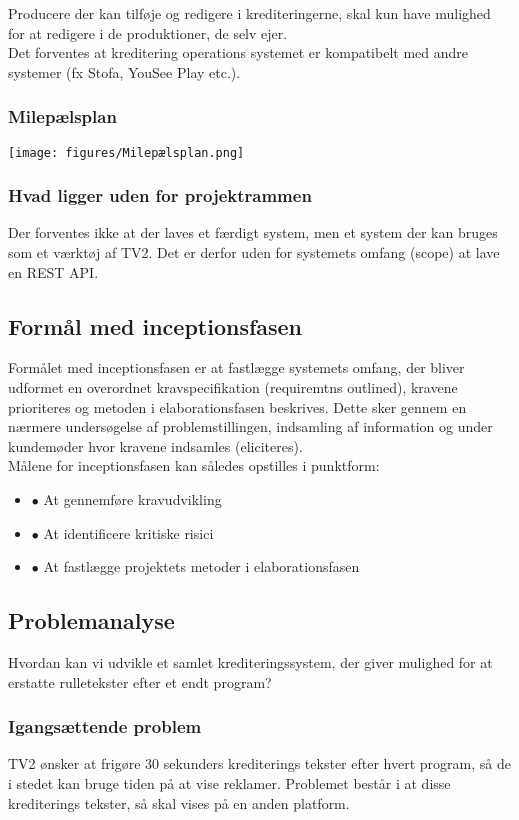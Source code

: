 \noindent
Producere der kan tilføje og redigere i krediteringerne, skal kun have mulighed for at redigere i de produktioner, de selv ejer.\\
Det forventes at kreditering operations systemet er kompatibelt med andre systemer (fx Stofa, YouSee Play etc.).

\subsubsection{Milepælsplan}
\texttt{[image: figures/Milepælsplan.png]}

\subsubsection{Hvad ligger uden for projektrammen}
Der forventes ikke at der laves et færdigt system, men et system der kan bruges som et værktøj af TV2. Det er derfor uden for systemets omfang (scope) at lave en REST API.

\subsection{Formål med inceptionsfasen}
Formålet med inceptionsfasen er at fastlægge systemets omfang, der bliver udformet en overordnet kravspecifikation (requiremtns outlined), kravene prioriteres og metoden i elaborationsfasen beskrives. Dette sker gennem en nærmere undersøgelse af problemstillingen, indsamling af information og under kundemøder hvor kravene indsamles (eliciteres).\\

\noindent
Målene for inceptionsfasen kan således opstilles i punktform:
\begin{itemize}
    \item $\bullet$ At gennemføre kravudvikling
    \item $\bullet$ At identificere kritiske risici
    \item $\bullet$ At fastlægge projektets metoder i elaborationsfasen
\end{itemize}

\subsection{Problemanalyse}
Hvordan kan vi udvikle et samlet krediteringssystem, der giver mulighed for at erstatte rulletekster efter et endt program?

\subsubsection{Igangsættende problem}
TV2 ønsker at frigøre 30 sekunders krediterings tekster efter hvert program, så de i stedet kan bruge tiden på at vise reklamer. Problemet består i at disse krediterings tekster, så skal vises på en anden platform. \\

